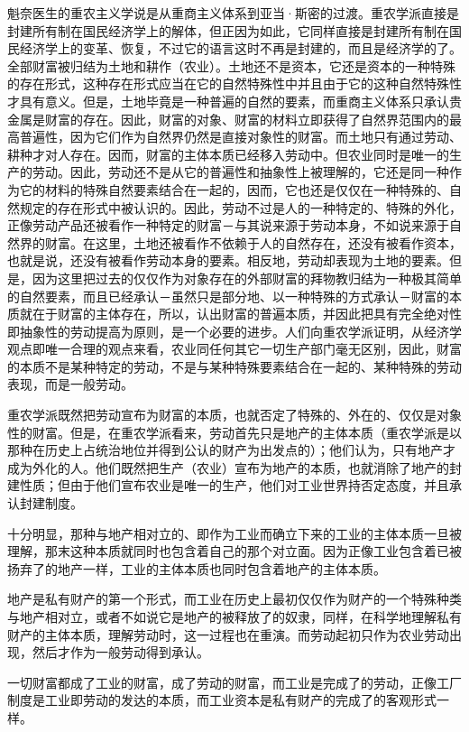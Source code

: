 \documentclass[a4paper,twoside,12pt,AutoFakeBold]{ctexart}
\begin{document}
魁奈医生的重农主义学说是从重商主义体系到亚当·斯密的过渡。重农学派直接是封建所有制在国民经济学上的解体，但正因为如此，它同样直接是封建所有制在国民经济学上的变革、恢复，不过它的语言这时不再是封建的，而且是经济学的了。全部财富被归结为土地和耕作（农业）。土地还不是资本，它还是资本的一种特殊的存在形式，这种存在形式应当在它的自然特殊性中并且由于它的这种自然特殊性才具有意义。但是，土地毕竟是一种普遍的自然的要素，而重商主义体系只承认贵金属是财富的存在。因此，财富的对象、财富的材料立即获得了自然界范围内的最高普遍性，因为它们作为自然界仍然是直接对象性的财富。而土地只有通过劳动、耕种才对人存在。因而，财富的主体本质已经移入劳动中。但农业同时是唯一的生产的劳动。因此，劳动还不是从它的普遍性和抽象性上被理解的，它还是同一种作为它的材料的特殊自然要素结合在一起的，因而，它也还是仅仅在一种特殊的、自然规定的存在形式中被认识的。因此，劳动不过是人的一种特定的、特殊的外化，正像劳动产品还被看作一种特定的财富－与其说来源于劳动本身，不如说来源于自然界的财富。在这里，土地还被看作不依赖于人的自然存在，还没有被看作资本，也就是说，还没有被看作劳动本身的要素。相反地，劳动却表现为土地的要素。但是，因为这里把过去的仅仅作为对象存在的外部财富的拜物教归结为一种极其简单的自然要素，而且已经承认－虽然只是部分地、以一种特殊的方式承认－财富的本质就在于财富的主体存在，所以，认出财富的普遍本质，并因此把具有完全绝对性即抽象性的劳动提高为原则，是一个必要的进步。人们向重农学派证明，从经济学观点即唯一合理的观点来看，农业同任何其它一切生产部门毫无区别，因此，财富的本质不是某种特定的劳动，不是与某种特殊要素结合在一起的、某种特殊的劳动表现，而是一般劳动。

重农学派既然把劳动宣布为财富的本质，也就否定了特殊的、外在的、仅仅是对象性的财富。但是，在重农学派看来，劳动首先只是地产的主体本质（重农学派是以那种在历史上占统治地位并得到公认的财产为出发点的）；他们认为，只有地产才成为外化的人。他们既然把生产（农业）宣布为地产的本质，也就消除了地产的封建性质；但由于他们宣布农业是唯一的生产，他们对工业世界持否定态度，并且承认封建制度。

十分明显，那种与地产相对立的、即作为工业而确立下来的工业的主体本质一旦被理解，那末这种本质就同时也包含着自己的那个对立面。因为正像工业包含着已被扬弃了的地产一样，工业的主体本质也同时包含着地产的主体本质。

地产是私有财产的第一个形式，而工业在历史上最初仅仅作为财产的一个特殊种类与地产相对立，或者不如说它是地产的被释放了的奴隶，同样，在科学地理解私有财产的主体本质，理解劳动时，这一过程也在重演。而劳动起初只作为农业劳动出现，然后才作为一般劳动得到承认。

一切财富都成了工业的财富，成了劳动的财富，而工业是完成了的劳动，正像工厂制度是工业即劳动的发达的本质，而工业资本是私有财产的完成了的客观形式一样。
\end{document}
